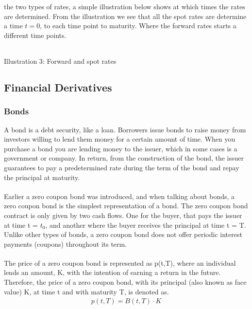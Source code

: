 the two types of rates, a simple illustration below shows at which times the rates are determined. From the illustration
we see that all the spot rates are determine a time $t=0$, to each time point to maturity. Where the forward rates starts
a different time points. 
\begin{center}
    \\[10pt] 
    Illustration 3: Forward and spot rates
\end{center}
\subsection{Financial Derivatives}
\subsubsection{Bonds}
A bond is a debt security, like a loan. Borrowers issue bonds to raise money 
from investors willing to lend them money for a certain amount of time.
When you purchase a bond you are lending money to the issuer, which in 
some cases is a government or company. In return, from the construction of the 
bond, the issuer guarantees to pay a predetermined rate during the term of the bond
and repay the principal at maturity. 
\\\\
Earlier a zero coupon bond was introduced, and when talking about bonds, a zero coupon 
bond is the simplest representation of a bond. The zero coupon bond contract is 
only given by two cash flows. One for the buyer, that pays the issuer at time 
t = $t_0$, and another where the buyer receives the principal at time t = T.
Unlike other types of bonds, a zero coupon bond does not offer periodic 
interest payments (coupons) throughout its term. \cite{Bjork} 
\\\\
The price of a zero coupon bond is represented as 
p(t,T), where an individual lends an amount, K, with the intention of earning a
return in the future. Therefore, the price of a zero coupon bond, with 
its principal (also known as face value) K, at time t and with maturity 
T, is denoted as.
\begin{align*}
    p(t,T)= B(t,T)\cdot K
\end{align*}

